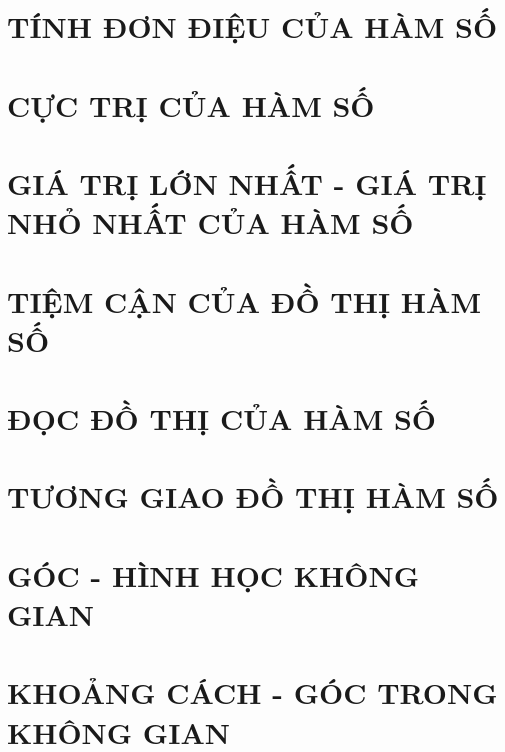 \documentclass[12pt,a4paper,oneside]{extbook}
\theoremstyle{plain}
\theoremstyle{nonumberplain}
\newcounter{de}
\begin{document}
		\thispagestyle{empty}
		\tableofcontents %
		\cleardoublepage %
		\clearpage%


\setcounter{page}{1}
\setcounter{chapter}{0}
\chapter{TÍNH ĐƠN ĐIỆU CỦA HÀM SỐ}



\chapter{CỰC TRỊ CỦA HÀM SỐ}


\chapter{GIÁ TRỊ LỚN NHẤT - GIÁ TRỊ NHỎ NHẤT CỦA HÀM SỐ}



\chapter{TIỆM CẬN CỦA ĐỒ THỊ HÀM SỐ}



\chapter{ĐỌC ĐỒ THỊ CỦA HÀM SỐ}


\chapter{TƯƠNG GIAO ĐỒ THỊ HÀM SỐ}



\chapter{GÓC - HÌNH HỌC KHÔNG GIAN}

\chapter{KHOẢNG CÁCH - GÓC TRONG KHÔNG GIAN}

\end{document}
